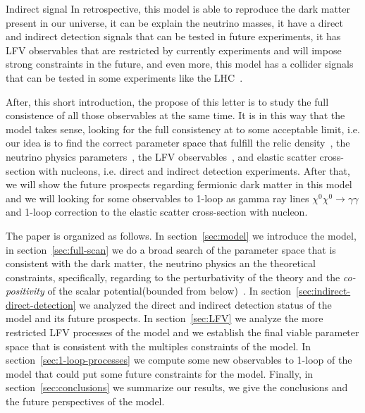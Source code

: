 \documentclass[12pt,letterpaper]{article}
\begin{document}
%
Indirect signal
%
In retrospective, this model is able to reproduce the dark matter present in our universe, it can be explain the neutrino masses, it have a direct and indirect detection signals that can be tested in future experiments, it has LFV observables that are restricted by currently experiments and will impose strong constraints in the future, and even more, this model has a collider signals that can be tested in some experiments like the LHC~\cite{Choubey:2017yyn}. 

After, this short introduction, the propose of this letter is to study the full consistence of all those observables at the same time. It is in this way that the model takes sense, looking for the full consistency at to some acceptable limit, i.e. 
our idea is to find the correct parameter space that fulfill the relic density~\cite{Aghanim:2018eyx}, the neutrino physics parameters~\cite{Forero:2014bxa, deSalas:2017kay}, the LFV observables~\cite{Rocha-Moran:2016enp}, and elastic scatter cross-section with nucleons, i.e. direct and indirect detection experiments. 
After that, we will show the future prospects regarding fermionic dark matter in this model and we will looking for some observables to 1-loop as gamma ray lines $\chi^0\chi^0\to\gamma\gamma$ and 1-loop correction to the elastic scatter cross-section with nucleon.

The paper is organized as follows. In section~\ref{sec:model} we introduce the model, in section~\ref{sec:full-scan} we do a broad search of the parameter space that is consistent with the dark matter, the neutrino physics an the theoretical constraints, specifically, regarding to the perturbativity of the theory and the \textit{co-positivity} of the scalar potential(bounded from below)~\cite{Merle:2016scw}. 
In section~\ref{sec:indirect-direct-detection} we analyzed the direct and indirect detection status of the model and its future prospects. 
In section~\ref{sec:LFV} we analyze the more restricted LFV processes of the model and we establish the final viable parameter space that is consistent with the multiples constraints of the model.
In section~\ref{sec:1-loop-processes} we compute some new observables to 1-loop of the model that could put some future constraints for the model.
Finally, in section~\ref{sec:conclusions} we summarize our results, we give the conclusions and the future perspectives of the model.







\end{document}
